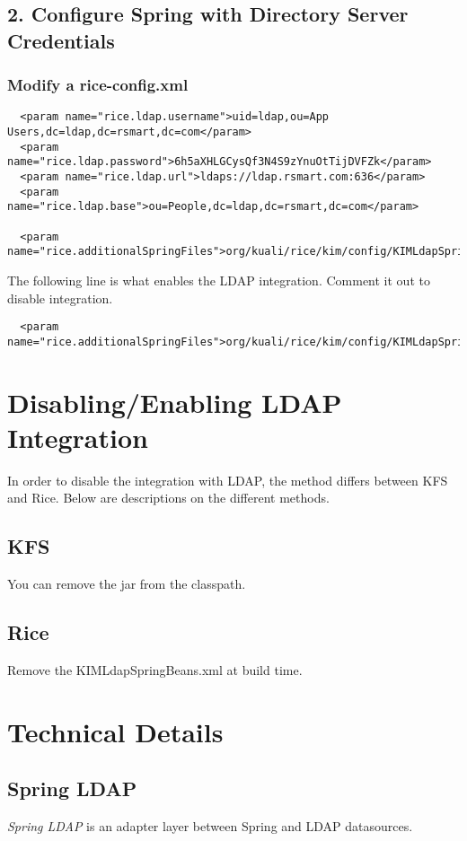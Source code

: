 \documentclass[12pt,notitlepage]{article}
\begin{document}
\subsection*{2. Configure Spring with Directory Server Credentials}
\subsubsection*{Modify a rice-config.xml}
\begin{lstlisting}
  <param name="rice.ldap.username">uid=ldap,ou=App Users,dc=ldap,dc=rsmart,dc=com</param>
  <param name="rice.ldap.password">6h5aXHLGCysQf3N4S9zYnuOtTijDVFZk</param>
  <param name="rice.ldap.url">ldaps://ldap.rsmart.com:636</param>
  <param name="rice.ldap.base">ou=People,dc=ldap,dc=rsmart,dc=com</param>

  <param name="rice.additionalSpringFiles">org/kuali/rice/kim/config/KIMLdapSpringBeans.xml</param>
\end{lstlisting}

The following line is what enables the LDAP integration. Comment it out to disable integration.
\begin{lstlisting}
  <param name="rice.additionalSpringFiles">org/kuali/rice/kim/config/KIMLdapSpringBeans.xml</param>
\end{lstlisting}

\section{Disabling/Enabling LDAP Integration}
In order to disable the integration with LDAP, the method differs between KFS and Rice. Below
are descriptions on the different methods.

\subsection{KFS}
You can remove the jar from the classpath.

\subsection{Rice}
Remove the KIMLdapSpringBeans.xml at build time.

\section{Technical Details}
\subsection{Spring LDAP}
\emph{Spring LDAP} is an adapter layer between Spring and LDAP datasources. 
\end{document}
